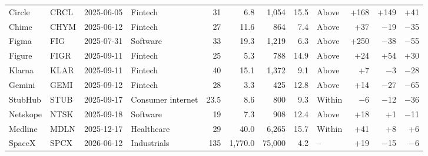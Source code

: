 \begin{scriptsize}
\begin{longtable}{llllrrrrlrrr}
Circle & CRCL & 2025-06-05 & Fintech & 31 & 6.8 & 1,054 & 15.5 & Above & +168 & +149 & +41 \\
Chime & CHYM & 2025-06-12 & Fintech & 27 & 11.6 & 864 & 7.4 & Above & +37 & $-$19 & $-$35 \\
Figma & FIG & 2025-07-31 & Software & 33 & 19.3 & 1,219 & 6.3 & Above & +250 & $-$38 & $-$55 \\
Figure & FIGR & 2025-09-11 & Fintech & 25 & 5.3 & 788 & 14.9 & Above & +24 & +54 & +30 \\
Klarna & KLAR & 2025-09-11 & Fintech & 40 & 15.1 & 1,372 & 9.1 & Above & +7 & $-$3 & $-$28 \\
Gemini & GEMI & 2025-09-12 & Fintech & 28 & 3.3 & 425 & 12.8 & Above & +14 & $-$27 & $-$65 \\
StubHub & STUB & 2025-09-17 & Consumer internet & 23.5 & 8.6 & 800 & 9.3 & Within & $-$6 & $-$12 & $-$36 \\
Netskope & NTSK & 2025-09-18 & Software & 19 & 7.3 & 908 & 12.4 & Above & +18 & +1 & $-$11 \\
Medline & MDLN & 2025-12-17 & Healthcare & 29 & 40.0 & 6,265 & 15.7 & Within & +41 & +8 & +6 \\
SpaceX & SPCX & 2026-06-12 & Industrials & 135 & 1,770.0 & 75,000 & 4.2 & -- & +19 & $-$15 & $-$6 \\
\end{longtable}
\end{scriptsize}
